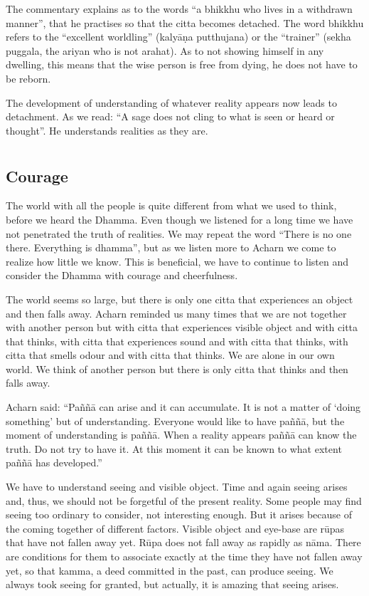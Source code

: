 The commentary explains as to the words ``a bhikkhu who lives in a
withdrawn manner'', that he practises so that the citta becomes
detached. The word bhikkhu refers to the ``excellent worldling''
(kalyāṇa putthujana) or the ``trainer'' (sekha puggala, the ariyan who
is not arahat). As to not showing himself in any dwelling, this means
that the wise person is free from dying, he does not have to be reborn.

The development of understanding of whatever reality appears now leads
to detachment. As we read: ``A sage does not cling to what is seen or
heard or thought''. He understands realities as they are.


\chapter[Courage]{}
\section*{Courage}

The world with all the people is quite different from what we used to
think, before we heard the Dhamma. Even though we listened for a long
time we have not penetrated the truth of realities. We may repeat the
word ``There is no one there. Everything is dhamma'', but as we listen
more to Acharn we come to realize how little we know. This is
beneficial, we have to continue to listen and consider the Dhamma with
courage and cheerfulness.

The world seems so large, but there is only one citta that experiences
an object and then falls away. Acharn reminded us many times that we are
not together with another person but with citta that experiences visible
object and with citta that thinks, with citta that experiences sound and
with citta that thinks, with citta that smells odour and with citta that
thinks. We are alone in our own world. We think of another person but
there is only citta that thinks and then falls away.

Acharn said: ``Paññā can arise and it can accumulate. It is not a matter
of `doing something' but of understanding. Everyone would like to have
paññā, but the moment of understanding is paññā. When a reality appears
paññā can know the truth. Do not try to have it. At this moment it can
be known to what extent paññā has developed.''

We have to understand seeing and visible object. Time and again seeing
arises and, thus, we should not be forgetful of the present reality.
Some people may find seeing too ordinary to consider, not interesting
enough. But it arises because of the coming together of different
factors. Visible object and eye-base are rūpas that have not fallen away
yet. Rūpa does not fall away as rapidly as nāma. There are conditions
for them to associate exactly at the time they have not fallen away yet,
so that kamma, a deed committed in the past, can produce seeing. We
always took seeing for granted, but actually, it is amazing that seeing
arises.

